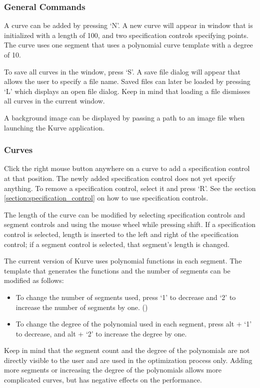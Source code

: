 \documentclass[a4paper]{article}
\begin{document}
				\subsubsection{General Commands}
				
					A curve can be added by pressing `N'. A new curve will appear in window that is initialized with a length of 100, and two specification controls specifying points. The curve uses one segment that uses a polynomial curve template with a degree of 10.
					
					To save all curves in the window, press `S'. A save file dialog will appear that allows the user to specify a file name. Saved files can later be loaded by pressing `L' which displays an open file dialog. Keep in mind that loading a file dismisses all curves in the current window.
					
					A background image can be displayed by passing a path to an image file when launching the Kurve application.
					
				\subsubsection{Curves}
					
					Click the right mouse button anywhere on a curve to add a specification control at that position. The newly added specification control does not yet specify anything. To remove a specification control, select it and press `R'. See the section \ref{section:specification_control} on how to use specification controls. 
					
					The length of the curve can be modified by selecting specification controls and segment controls and using the mouse wheel while pressing shift. If a specification control is selected, length is inserted to the left and right of the specification control; if a segment control is selected, that segment's length is changed.
					
					The current version of Kurve uses polynomial functions in each segment. The template that generates the functions and the number of segments can be modified as follows:
					
					\begin{itemize}
						\item To change the number of segments used, press `1' to decrease and `2' to increase the number of segments by one. ()
						\item To change the degree of the polynomial used in each segment, press alt + `1' to decrease, and alt + `2' to increase the degree by one.
					\end{itemize}
					Keep in mind that the segment count and the degree of the polynomials are not directly visible to the user and are used in the optimization process only. Adding more segments or increasing the degree of the polynomials allows more complicated curves, but has negative effects on the performance.
\end{document}
